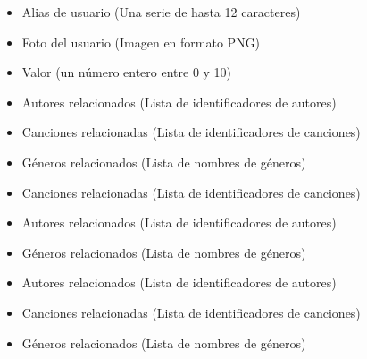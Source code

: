 \begin{itemize}
\item Alias de usuario (Una serie de hasta 12 caracteres)
\item Foto del usuario (Imagen en formato PNG)
\item Valor (un número entero entre 0 y 10)
\end{itemize}



\begin{itemize}
\item Autores relacionados (Lista de identificadores de autores)
\item Canciones relacionadas (Lista de identificadores de canciones)
\item Géneros relacionados (Lista de nombres de géneros)
\end{itemize}

\begin{itemize}
\item Canciones relacionadas (Lista de identificadores de canciones)
\end{itemize}

\begin{itemize}
\item Autores relacionados (Lista de identificadores de autores)
\end{itemize}

\begin{itemize}
\item Géneros relacionados (Lista de nombres de géneros)
\end{itemize}

\begin{itemize}
\item Autores relacionados (Lista de identificadores de autores)
\item Canciones relacionadas (Lista de identificadores de canciones)
\item Géneros relacionados (Lista de nombres de géneros)
\end{itemize}

